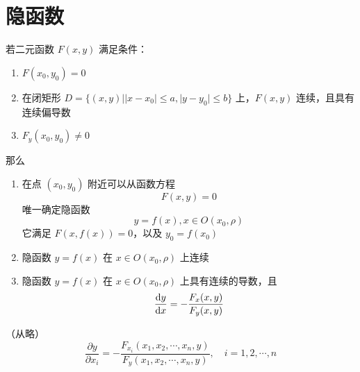 \documentclass{ctexbook}
\def\diff{\textnormal{d}}
\begin{document}
\section{隐函数}

\begin{theorem}[一元隐函数存在定理]
    若二元函数 $F(x,y)$ 满足条件：
    \begin{enumerate}
        \item $F(x_0,y_0)=0$
        \item 在闭矩形 $D=\{(x,y)||x-x_0|\leq a,|y-y_0|\leq b\}$ 上，$F(x,y)$ 连续，且具有连续偏导数
        \item $F_y(x_0,y_0)\neq 0$
    \end{enumerate}
    那么
    \begin{enumerate}
        \item 在点 $(x_0,y_0)$ 附近可以从函数方程
        \begin{equation*}
            F(x,y)=0
        \end{equation*}
        唯一确定隐函数
        \begin{equation}
            y=f(x), x\in O(x_0,\rho)
        \end{equation}
        它满足 $F(x,f(x))=0$，以及 $y_0=f(x_0)$
        \item 隐函数 $y=f(x)$ 在 $x\in O(x_0,\rho)$ 上连续
        \item 隐函数 $y=f(x)$ 在 $x\in O(x_0,\rho)$ 上具有连续的导数，且
        \begin{equation}
            \frac{\diff y}{\diff x}=-\frac{F_x(x,y)}{F_y(x,y)}
        \end{equation}
    \end{enumerate}
\end{theorem}

\begin{theorem}[多元隐函数存在定理]
    （从略）
    \begin{equation}
        \frac{\partial y}{\partial x_i}=-\frac{F_{x_i}(x_1,x_2,\cdots,x_n,y)}{F_y(x_1,x_2,\cdots,x_n,y)},\quad i=1,2,\cdots,n
    \end{equation}
\end{theorem}
\end{document}
